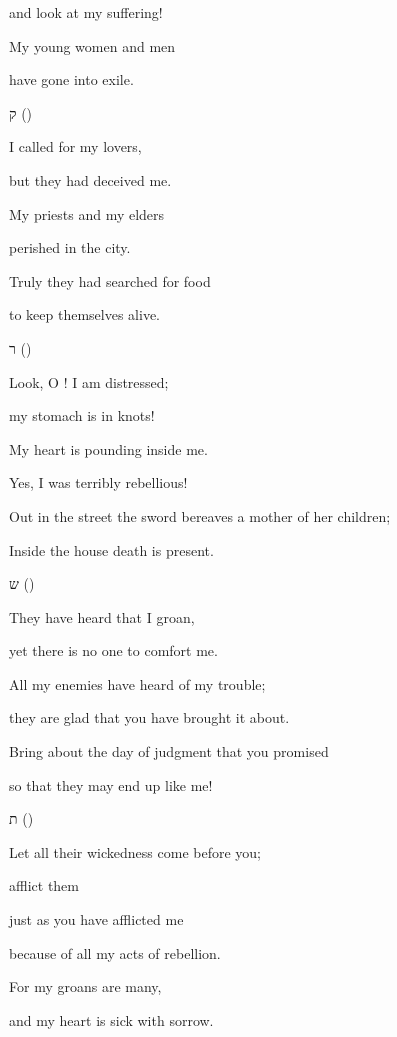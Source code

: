 {\par }{\Q and
look at my
suffering!
\par }{\Q My young
women and
men
\par }{\Q have
gone into exile.
\par }{\SH ק ({})
\par }{\Q {}I called for my lovers,
\par }{\Q but they had deceived me.
\par }{\Q My priests and my elders
\par }{\Q perished in the city.
\par }{\Q Truly they had searched for food
\par }{\Q to keep themselves alive.
\par }{\SH ר ({})
\par }{\Q {}Look, O
{}! I am distressed;
\par }{\Q my stomach is in knots!
\par }{\Q My heart is pounding inside me.
\par }{\Q Yes, I was terribly rebellious!
\par }{\Q Out in the street the sword bereaves a mother of her children;
\par }{\Q Inside the house death is present.
\par }{\SH ש ({})
\par }{\Q {}They have heard that I groan,
\par }{\Q yet there is no one to comfort me.
\par }{\Q All my enemies have heard of my trouble;
\par }{\Q they are glad that you have brought it about.
\par }{\Q Bring about the day of judgment that you promised
\par }{\Q so that they may end up like me!
\par }{\SH ת ({})
\par }{\Q {}Let all their wickedness come before you;
\par }{\Q afflict them
\par }{\Q just as you have afflicted me
\par }{\Q because of all my acts of rebellion.
\par }{\Q For my groans are many,
\par }{\Q and my heart is sick with sorrow.

\par }
